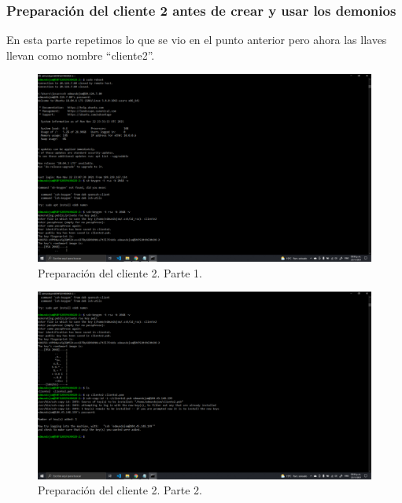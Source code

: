 \documentclass[11pt]{article}
\begin{document}
		\subsubsection{Preparación del cliente 2 antes de crear y usar los demonios}
		En esta parte repetimos lo que se vio en el punto anterior pero ahora las llaves llevan como nombre ``cliente2''.
		\begin{figure}[H]
			\centering
			\includegraphics[scale=0.34]{resources/preparacionCliente2.1.png}
			\caption{Preparación del cliente 2. Parte 1.}\label{fig:picture}
		\end{figure}
		\begin{figure}[H]
			\centering
			\includegraphics[scale=0.34]{resources/preparacionCliente2.2.png}
			\caption{Preparación del cliente 2. Parte 2.}\label{fig:picture}
		\end{figure}
\end{document}

